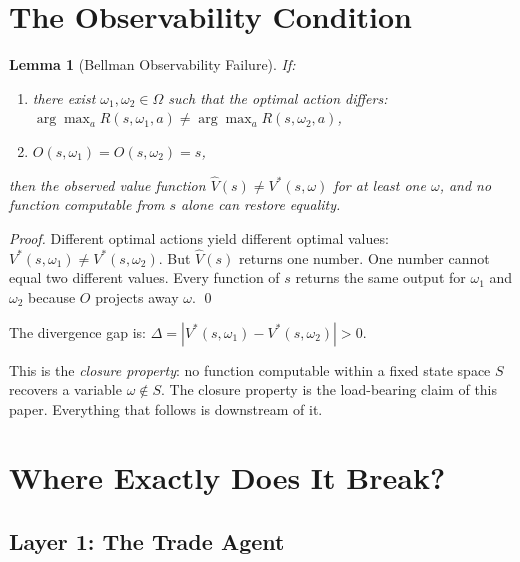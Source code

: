 \documentclass[11pt,a4paper]{article}
\newtheorem{lemma}[theorem]{Lemma}
\begin{document}
\section{The Observability Condition}
\label{sec:observability}

\begin{lemma}[Bellman Observability Failure]
\label{thm:bellman}
If:
\begin{enumerate}[label=(\roman*)]
  \item there exist $\omega_1, \omega_2 \in \Omega$ such that the 
  optimal action differs:
  $\arg\max_a R(s, \omega_1, a) \neq \arg\max_a R(s, \omega_2, a)$,
  \item $O(s, \omega_1) = O(s, \omega_2) = s$,
\end{enumerate}
then the observed value function $\hat{V}(s) \neq V^*(s, \omega)$ 
for at least one $\omega$, and no function computable from $s$ alone 
can restore equality.
\end{lemma}

\begin{proof}
Different optimal actions yield different optimal values: 
$V^*(s, \omega_1) \neq V^*(s, \omega_2)$. But $\hat{V}(s)$ returns 
one number. One number cannot equal two different values. Every 
function of $s$ returns the same output for $\omega_1$ and $\omega_2$ 
because $O$ projects away $\omega$. \qed
\end{proof}

The divergence gap is:
$\Delta = |V^*(s, \omega_1) - V^*(s, \omega_2)| > 0$.

This is the \emph{closure property}: no function computable within 
a fixed state space $S$ recovers a variable $\omega \notin S$. The 
closure property is the load-bearing claim of this paper. Everything 
that follows is downstream of it.


\section{Where Exactly Does It Break?}
\label{sec:where}

\subsection{Layer 1: The Trade Agent}
\end{document}

